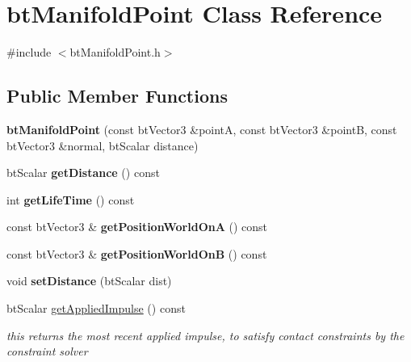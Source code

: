 \hypertarget{classbtManifoldPoint}{}\section{bt\+Manifold\+Point Class Reference}
\label{classbtManifoldPoint}


{\ttfamily \#include $<$bt\+Manifold\+Point.\+h$>$}

\subsection*{Public Member Functions}
\begin{DoxyCompactItemize}
\item 
\mbox{\label{classbtManifoldPoint_afe9cbdf9719330ba37bf4079c2896159}} 
{\bfseries bt\+Manifold\+Point} (const bt\+Vector3 \&pointA, const bt\+Vector3 \&pointB, const bt\+Vector3 \&normal, bt\+Scalar distance)
\item 
\mbox{\label{classbtManifoldPoint_a42cd47cba8f5e1e3f6c24c910224df6d}} 
bt\+Scalar {\bfseries get\+Distance} () const
\item 
\mbox{\label{classbtManifoldPoint_a4d4623c815e1713ac48026dcac4fcaf8}} 
int {\bfseries get\+Life\+Time} () const
\item 
\mbox{\label{classbtManifoldPoint_ac17f12f3990802262cbef0dc958a8e8b}} 
const bt\+Vector3 \& {\bfseries get\+Position\+World\+OnA} () const
\item 
\mbox{\label{classbtManifoldPoint_a4b1e20a2fe1675f32931d221046139d9}} 
const bt\+Vector3 \& {\bfseries get\+Position\+World\+OnB} () const
\item 
\mbox{\label{classbtManifoldPoint_a952646d751054a5c942e01198ab85cf3}} 
void {\bfseries set\+Distance} (bt\+Scalar dist)
\item 
\mbox{\label{classbtManifoldPoint_af731843210d9d3dace170d457d34c0b8}} 
bt\+Scalar \hyperlink{classbtManifoldPoint_af731843210d9d3dace170d457d34c0b8}{get\+Applied\+Impulse} () const
\begin{DoxyCompactList}\small\item\em this returns the most recent applied impulse, to satisfy contact constraints by the constraint solver \end{DoxyCompactList}\item 

\end{DoxyCompactItemize}

